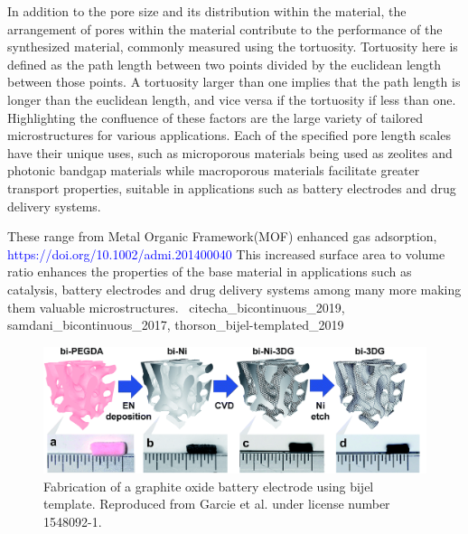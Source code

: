 In addition to the pore size and its distribution within the material, the arrangement of pores within the material contribute to the 
performance of the synthesized material, commonly measured using the tortuosity. Tortuosity here is defined as the path length between 
two points divided by the euclidean length between those points. A tortuosity larger than one implies that the path length is longer 
than the euclidean length, and vice versa if the tortuosity if less than one. Highlighting the confluence of these factors are the 
large variety of tailored microstructures for various applications. Each of the specified pore length scales have their unique uses, 
such as microporous materials being used as zeolites and photonic bandgap materials while macroporous materials facilitate greater 
transport properties, suitable in applications such as battery electrodes and drug delivery systems. \cite{chen_tortuosity_2020, 
ebner_tortuosity_2014} 

These range from Metal Organic Framework(MOF) enhanced gas adsorption, \textcolor{blue}{https://doi.org/10.1002/admi.201400040} 
This increased surface area to volume ratio enhances the properties of the base material in applications such as catalysis, 
battery electrodes and drug delivery systems among many more making them valuable microstructures. \
cite{cha_bicontinuous_2019, samdani_bicontinuous_2017, thorson_bijel-templated_2019}

\begin{figure}
    \centering
    \includegraphics[scale = 0.5]{figures/introduction/bijel_templating.png}
    \caption{Fabrication of a graphite oxide battery electrode using bijel template. Reproduced from Garcie et al. under license number 1548092-1. \cite{garcia_scalable_2019}}
    \label{fig:bijel_template}
\end{figure}

